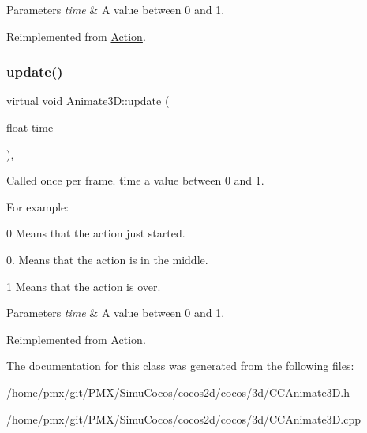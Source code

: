\begin{DoxyParams}{Parameters}
{\em time} & A value between 0 and 1. \\
\hline
\end{DoxyParams}


Reimplemented from \hyperlink{classAction_a937e646e63915e33ad05ba149bfcf239}{Action}.

\mbox{\label{classAnimate3D_ae71b012a3b1dd55d12a50148755a5f68}} 
\subsubsection{\texorpdfstring{update()}{update()}\hspace{0.1cm}{\footnotesize\ttfamily [2/2]}}
{\footnotesize\ttfamily virtual void Animate3\+D\+::update (\begin{DoxyParamCaption}\item[{float}]{time }\end{DoxyParamCaption})\hspace{0.3cm}{\ttfamily [override]}, {\ttfamily [virtual]}}

Called once per frame. time a value between 0 and 1.

For example\+:
\begin{DoxyItemize}
\item 0 Means that the action just started.
\item 0. Means that the action is in the middle.
\item 1 Means that the action is over.
\end{DoxyItemize}


\begin{DoxyParams}{Parameters}
{\em time} & A value between 0 and 1. \\
\hline
\end{DoxyParams}


Reimplemented from \hyperlink{classAction_a937e646e63915e33ad05ba149bfcf239}{Action}.



The documentation for this class was generated from the following files\+:\begin{DoxyCompactItemize}
\item 
/home/pmx/git/\+P\+M\+X/\+Simu\+Cocos/cocos2d/cocos/3d/C\+C\+Animate3\+D.\+h\item 
/home/pmx/git/\+P\+M\+X/\+Simu\+Cocos/cocos2d/cocos/3d/C\+C\+Animate3\+D.\+cpp\end{DoxyCompactItemize}
